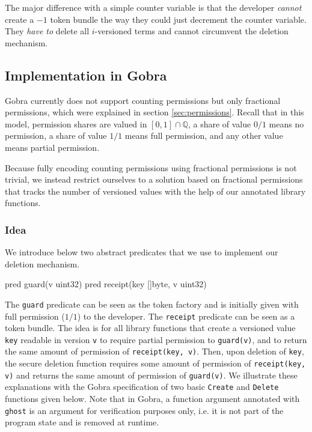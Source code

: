 The major difference with a simple counter variable is that the developer \emph{cannot} create a $-1$ token bundle the way they could just decrement the counter variable. They \emph{have to} delete all $i$-versioned terms and cannot circumvent the deletion mechanism.


\subsection{Implementation in Gobra}
\label{sec:implementation-in-gobra}

Gobra currently does not support counting permissions but only fractional permissions, which were explained in section \ref{sec:permissions}.
Recall that in this model, permission shares are valued in $[0,1]\cap\mathbb{Q}$, a share of value $0/1$ means no permission, a share of value $1/1$ means full permission, and any other value means partial permission.

Because fully encoding counting permissions using fractional permissions is not trivial, we instead restrict ourselves to a solution based on fractional permissions that tracks the number of versioned values with the help of our annotated library functions.

\subsubsection{Idea}
\label{sec:counting-permissions-idea}

We introduce below two abstract predicates that we use to implement our deletion mechanism.

\begin{gobra}
pred guard(v uint32)
pred receipt(key []byte, v uint32)
\end{gobra}

The \texttt{guard} predicate can be seen as the token factory and is initially given with full permission ($1/1$) to the developer.
The \texttt{receipt} predicate can be seen as a token bundle.
The idea is for all library functions that create a versioned value \texttt{key} readable in version \texttt{v} to require partial permission to \texttt{guard(v)}, and to return the same amount of permission of \texttt{receipt(key, v)}.
Then, upon deletion of \texttt{key}, the secure deletion function requires some amount of permission of \texttt{receipt(key, v)} and returns the same amount of permission of \texttt{guard(v)}.
We illustrate these explanations with the Gobra specification of two basic \texttt{Create} and \texttt{Delete} functions given below.
Note that in Gobra, a function argument annotated with \texttt{ghost} is an argument for verification purposes only, i.e. it is not part of the program state and is removed at runtime.

